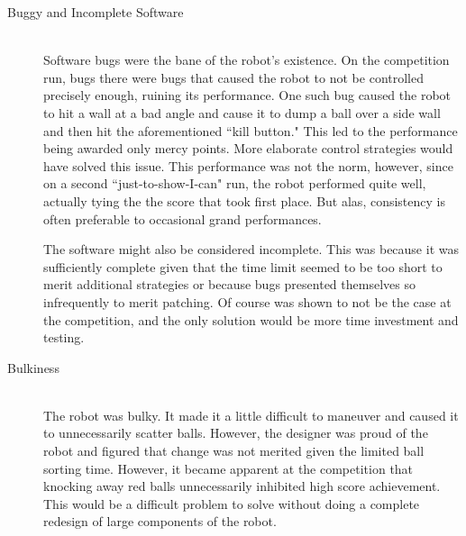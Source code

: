 \documentclass{article}
\begin{document}
\begin{description}
  \item[Buggy and Incomplete Software] \hfill \\
  Software bugs were the bane of the robot's existence. On the competition run, bugs there were bugs that caused the robot to not be controlled precisely enough, ruining its performance. One such bug caused the robot to hit a wall at a bad angle and cause it to dump a ball over a side wall and then hit the aforementioned ``kill button." This led to the performance being awarded only mercy points. More elaborate control strategies would have solved this issue. This performance was not the norm, however, since on a second ``just-to-show-I-can" run, the robot performed quite well, actually tying the the score that took first place. But alas, consistency is often preferable to occasional grand performances.

  The software might also be considered incomplete. This was because it was sufficiently complete given that the time limit seemed to be too short to merit additional strategies or because bugs presented themselves so infrequently to merit patching. Of course was shown to not be the case at the competition, and the only solution would be more time investment and testing.  


  \item[Bulkiness] \hfill \\
  The robot was bulky. It made it a little difficult to maneuver and caused it to unnecessarily scatter balls. However, the designer was proud of the robot and figured that change was not merited given the limited ball sorting time. However, it became apparent at the competition that knocking away red balls unnecessarily inhibited high score achievement. This would be a difficult problem to solve without doing a complete redesign of large components of the robot. 
\end{description}
\end{document}
